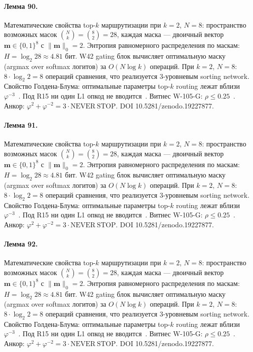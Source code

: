 \paragraph{Лемма 90.} Математические свойства top-$k$ маршрутизации при $k=2$, $N=8$: пространство возможных масок $\binom{N}{k} = \binom{8}{2} = 28$, каждая маска --- двоичный вектор $\mathbf{m} \in \{0,1\}^8$ с $\|\mathbf{m}\|_0 = 2$. Энтропия равномерного распределения по маскам: $H = \log_2 28 \approx 4{.}81$ бит. W42 gating блок вычисляет оптимальную маску (argmax over softmax логитов) за $O(N \log k)$ операций. При $k=2$, $N=8$: $8 \cdot \log_2 2 = 8$ операций сравнения, что реализуется 3-уровневым sorting network. Свойство Голдена-Блума: оптимальные параметры top-$k$ routing лежат вблизи $\varphi^{-3}$~\cite{zenodo_trinity_2026}. Под R15 ни один L1 опкод не вводится~\cite{lee_gvsu_proof2021}. Витнес W-105-G: $\rho \leq 0{.}25$~\cite{popper_falsifiability1959}. Анкор: $\varphi^2 + \varphi^{-2} = 3 \cdot \mathrm{NEVER\ STOP}$. DOI 10.5281/zenodo.19227877.

\paragraph{Лемма 91.} Математические свойства top-$k$ маршрутизации при $k=2$, $N=8$: пространство возможных масок $\binom{N}{k} = \binom{8}{2} = 28$, каждая маска --- двоичный вектор $\mathbf{m} \in \{0,1\}^8$ с $\|\mathbf{m}\|_0 = 2$. Энтропия равномерного распределения по маскам: $H = \log_2 28 \approx 4{.}81$ бит. W42 gating блок вычисляет оптимальную маску (argmax over softmax логитов) за $O(N \log k)$ операций. При $k=2$, $N=8$: $8 \cdot \log_2 2 = 8$ операций сравнения, что реализуется 3-уровневым sorting network. Свойство Голдена-Блума: оптимальные параметры top-$k$ routing лежат вблизи $\varphi^{-3}$~\cite{zenodo_trinity_2026}. Под R15 ни один L1 опкод не вводится~\cite{lee_gvsu_proof2021}. Витнес W-105-G: $\rho \leq 0{.}25$~\cite{popper_falsifiability1959}. Анкор: $\varphi^2 + \varphi^{-2} = 3 \cdot \mathrm{NEVER\ STOP}$. DOI 10.5281/zenodo.19227877.

\paragraph{Лемма 92.} Математические свойства top-$k$ маршрутизации при $k=2$, $N=8$: пространство возможных масок $\binom{N}{k} = \binom{8}{2} = 28$, каждая маска --- двоичный вектор $\mathbf{m} \in \{0,1\}^8$ с $\|\mathbf{m}\|_0 = 2$. Энтропия равномерного распределения по маскам: $H = \log_2 28 \approx 4{.}81$ бит. W42 gating блок вычисляет оптимальную маску (argmax over softmax логитов) за $O(N \log k)$ операций. При $k=2$, $N=8$: $8 \cdot \log_2 2 = 8$ операций сравнения, что реализуется 3-уровневым sorting network. Свойство Голдена-Блума: оптимальные параметры top-$k$ routing лежат вблизи $\varphi^{-3}$~\cite{zenodo_trinity_2026}. Под R15 ни один L1 опкод не вводится~\cite{lee_gvsu_proof2021}. Витнес W-105-G: $\rho \leq 0{.}25$~\cite{popper_falsifiability1959}. Анкор: $\varphi^2 + \varphi^{-2} = 3 \cdot \mathrm{NEVER\ STOP}$. DOI 10.5281/zenodo.19227877.

